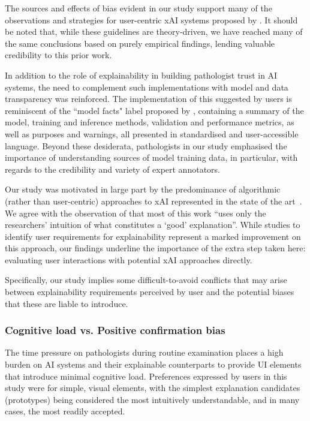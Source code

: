 \documentclass[final,5p,times,twocolumn,hyphens]{elsarticle}
\begin{document}
The sources and effects of bias evident in our study support many of the observations and strategies for user-centric xAI systems proposed by \citet{wang_designing_2019}. It should be noted that, while these guidelines are theory-driven, we have reached many of the same conclusions based on purely empirical findings, lending valuable credibility to this prior work.

In addition to the role of explainability in building pathologist trust in AI systems, the need to complement such implementations with model and data transparency was reinforced. The implementation of this suggested by users is reminiscent of the ``model facts" label proposed by \citet{sendak2020presenting}, containing a summary of the model, training and inference methods, validation and performance metrics, as well as purposes and warnings, all presented in standardised and user-accessible language. Beyond these desiderata, pathologists in our study emphasised the importance of understanding sources of model training data, in particular, with regards to the credibility and variety of expert annotators.

Our study was motivated in large part by the predominance of algorithmic (rather than user-centric) approaches to xAI represented in the state of the art~\cite{tjoa_survey_2020, poceviciute_survey_2020, antoniadi2021current}. We agree with the observation of \citet{miller2019explanation} that most of this work ``uses only the researchers' intuition of what constitutes a `good' explanation''.  While studies to identify user requirements for explainability represent a marked improvement on this approach, our findings underline the importance of the extra step taken here: evaluating user interactions with potential xAI approaches directly.

Specifically, our study implies some difficult-to-avoid conflicts that may arise between explainability requirements perceived by user and the potential biases that these are liable to introduce.

\subsubsection{Cognitive load vs. Positive confirmation bias}

The time pressure on pathologists during routine examination places a high burden on AI systems and their explainable counterparts to provide UI elements that introduce minimal cognitive load. Preferences expressed by users in this study were for simple, visual elements, with the simplest explanation candidates (prototypes) being considered the most intuitively understandable, and in many cases, the most readily accepted.
\end{document}
